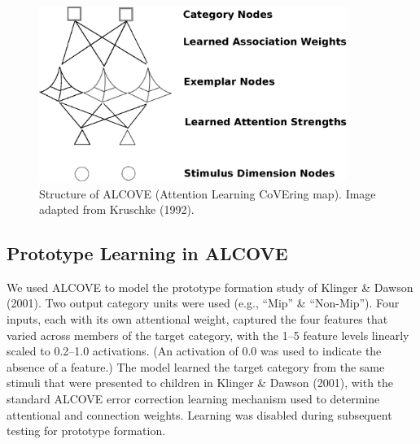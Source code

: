 \begin{figure}[ht]
\begin{center}
	\includegraphics[width=100mm]{figures/alcove.eps}
\end{center}
\caption{Structure of ALCOVE (Attention Learning CoVEring map). Image adapted from Kruschke (1992).}
\label{alcove}
\end{figure} 

\subsection{Prototype Learning in ALCOVE}
We used ALCOVE to model the prototype formation study of Klinger \& Dawson (2001). Two output category units were used (e.g., ``Mip'' \& ``Non-Mip''). Four inputs, each with its own attentional weight, captured the four features that varied across members of the target category, with the 1--5 feature levels linearly scaled to 0.2--1.0 activations. (An activation of 0.0 was used to indicate the absence of a feature.) The model learned the target category from the same stimuli that were presented to children in Klinger \& Dawson (2001), with the standard ALCOVE error correction learning mechanism used to determine attentional and connection weights. Learning was disabled during subsequent testing for prototype formation.


